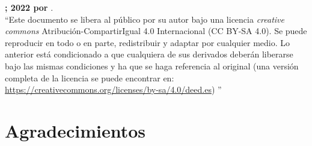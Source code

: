 \vspace{2in}
\noindent \textbf{\ccbysa; 2022 por \minombre}.\\
``Este documento se libera al público por su autor bajo una licencia
{\it creative commons} Atribución-CompartirIgual 4.0 Internacional (CC
BY-SA 4.0). Se puede reproducir en todo o en parte, redistribuir y
adaptar por cualquier medio. Lo anterior está condicionado a que
cualquiera de sus derivados deberán liberarse bajo las mismas
condiciones y ha que se haga referencia al original (una versión
completa de la licencia se puede encontrar en:
\url{https://creativecommons.org/licenses/by-sa/4.0/deed.es}) ''



\chapter*{Agradecimientos}


\tableofcontents
\listoffigures
\listoftables
\clearpage


